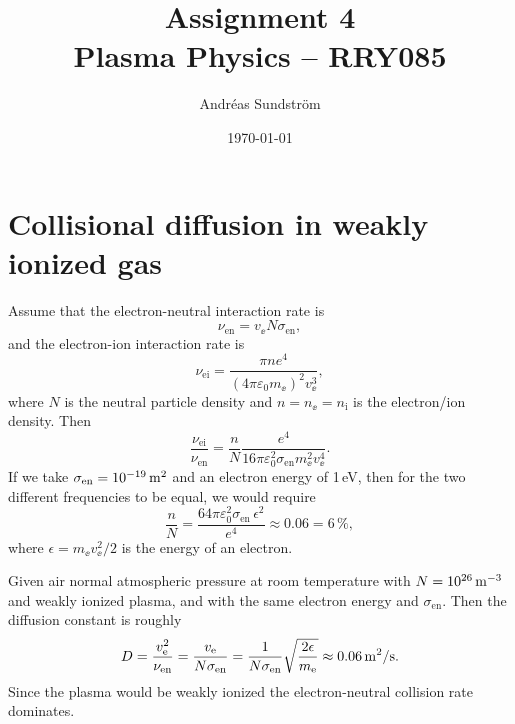 \documentclass[11pt,a4paper, 
swedish, english %
]{article}
\begin{document}


\title{Assignment 4 \\
{\Large Plasma Physics -- RRY085}}
\author{Andréas Sundström}
\date\today%

\maketitle


\section{Collisional diffusion in weakly ionized gas}
Assume that the electron-neutral interaction rate is
\begin{equation}
\nu_{\text{en}}=v_\ee N \sigma_\text{en},
\end{equation}
and the electron-ion interaction rate is
\begin{equation}
\nu_\text{ei}=\frac{\pi n e^4}{(4\pi\varepsilon_0 m_\ee)^2v_\ee^3},
\end{equation}
where $N$ is the neutral particle density and $n=n_\ee=n_\text{i}$ is
the electron/ion density. Then
\begin{equation}
\frac{\nu_\text{ei}}{\nu_{\text{en}}}
=\frac{n}{N}\frac{e^4}
{16\pi\varepsilon_0^2\sigma_\text{en}m_\ee^2 v_\ee^4}.
\end{equation}
If we take $\sigma_\text{en}=\unit[10^{-19}]{m^2}$ and an electron
energy of 1\,eV, then for the two different frequencies to be equal,
we would require 
\begin{equation}
\frac{n}{N}=
\frac{64\pi\varepsilon_0^2
\sigma_\text{en}\,\epsilon^2}{e^4}
\approx 0.06 = 6\,\%,
\end{equation}
where $\epsilon =m_\ee v_\ee^2/2$ is the energy of an electron.

Given air normal atmospheric pressure at room temperature with
$N=\unit[10^{26}]{m^{-3}}$ and weakly ionized plasma, and with the
same electron energy and $\sigma_\text{en}$. Then the diffusion
constant is roughly 
\begin{equation}
D=\frac{v_\ee^2}{\nu_\text{en}}
=\frac{v_\ee}{N\sigma_\text{en}}
=\frac{1}{N\sigma_\text{en}}\sqrt{\frac{2\epsilon}{m_\ee}}
\approx \unit[0.06]{m^2/s}.
\end{equation}
Since the plasma would be weakly ionized the electron-neutral
collision rate dominates. 
\end{document}
